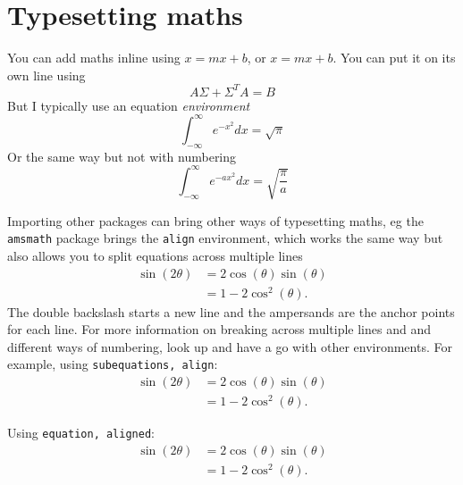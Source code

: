 \documentclass{article} %
\begin{document}
\endgroup




\section{Typesetting maths}

You can add maths inline using $x=mx + b$, or \(x=mx+b\). You can put it on its own line using 
\[
    A\Sigma + \Sigma^T A = B
\]
But I typically use an equation \textit{environment}
\begin{equation}
    \int_{-\infty}^\infty e^{-x^2} d x = \sqrt{\pi}
\end{equation}
Or the same way but not with numbering
\begin{equation*}
    \int_{-\infty}^\infty e^{-ax^2} d x = \sqrt{\frac{\pi}{a}}
\end{equation*}

Importing other packages can bring other ways of typesetting maths, eg the \texttt{amsmath} package brings the \texttt{align} environment, which works the same way but also allows you to split equations across multiple lines
\begin{align}
    \sin(2\theta) & = 2\cos(\theta)\sin(\theta) \\
    & = 1-2\cos^2(\theta).
\end{align}
The double backslash starts a new line and the ampersands are the anchor points for each line.
For more information on breaking across multiple lines and and different ways of numbering, look up and have a go with other environments.
For example, using \texttt{subequations, align}:
\begin{subequations} %
\begin{align} %
    \sin(2\theta) & = 2\cos(\theta)\sin(\theta) \\
    & = 1-2\cos^2(\theta).
\end{align}
\end{subequations}

Using \texttt{equation, aligned}:
\begin{equation} %
\begin{aligned} %
    \sin(2\theta) & = 2\cos(\theta)\sin(\theta) \\
    & = 1-2\cos^2(\theta).
\end{aligned}
\end{equation}
\end{document}
